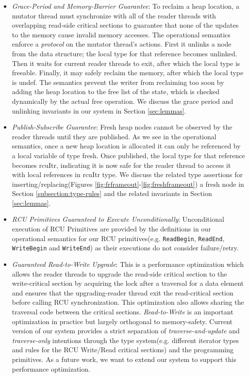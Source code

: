 \begin{itemize}
  \item \textit{Grace-Period and Memory-Barrier Guarantee}: To reclaim a heap location, a mutator thread must synchronize with all of the reader threads with overlapping read-side critical sections to guarantee that none of the updates to the memory cause invalid memory accesses.
The operational semantics enforce a \textit{protocol} on the mutator thread's actions. First it unlinks a node from the data structure; the local type for that reference becomes \textsf{unlinked}. Then it waits for current reader threads to exit, after which the local type is \textsf{freeable}. Finally, it may safely reclaim the memory, after which the local type is \textsf{undef}.
The semantics prevent the writer from reclaiming too soon by adding the heap location to the free list of the state, which is checked dynamically by the actual free operation. We discuss the grace period and unlinking invariants in our system in Section \ref{sec:lemmas}.
\item \textit{Publish-Subscribe Guarantee}: Fresh heap nodes cannot be observed by the reader threads until they are published. As we see in the operational semantics, once a new heap location is allocated it can only be referenced by a local variable of type \textsf{fresh}. Once published, the local type for that reference becomes \textsf{rcuItr}, indicating it is now safe for the reader thread to access it with local references in \textsf{rcuItr} type. We discuss the related type assertions for inserting/replacing(Figures \ref{fig:frframeout}-\ref{fig:freshframeout}) a fresh node in Section \ref{subsection:type-rules} and the related invariants in Section \ref{sec:lemmas}.
\item \textit{RCU Primitives Guaranteed to Execute Unconditionally}: Unconditional execution of RCU Primitives are provided by the definitions in our operational semantics for our RCU primitives(e.g. \lstinline|ReadBegin|, \lstinline|ReadEnd|, \lstinline|WriteBegin| and \lstinline|WriteEnd|) as their executions do not consider failure/retry.
\item \textit{Guaranteed Read-to-Write Upgrade}: This is a performance optimization which allows the reader threads to upgrade the read-side critical section to the write-critical section by acquiring the lock after a traversal for a data element and ensures that the upgrading-reader thread exit the read-critical section before calling RCU synchronization. This optimization also allows sharing the traversal code between the critical sections. \textit{Read-to-Write} is an important optimization in practice but largely orthogonal to memory-safety. Current version of our system provides a strict separation of \textit{traverse-and-update} and \textit{traverse-only} intentions through the type system(e.g. different iterator types and rules for the RCU Write/Read critical sections) and the programming primitives. As a future work, we want to extend our system to support this performance optimization.
  \end{itemize}
